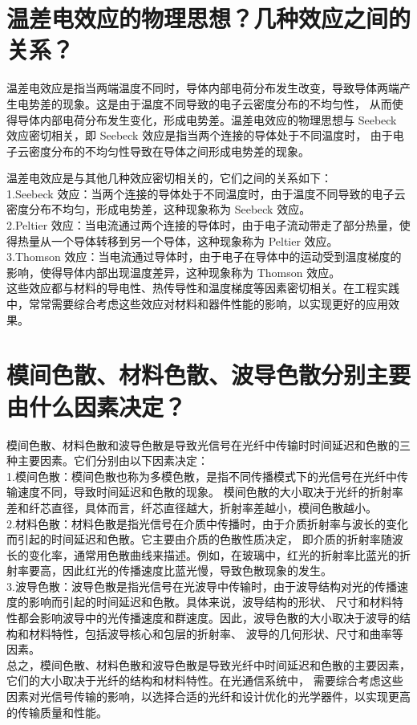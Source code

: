 \documentclass[12pt, a4paper, oneside]{article}
\begin{document}
\begin{spacing}{2.0}
\section{温差电效应的物理思想？几种效应之间的关系？}
温差电效应是指当两端温度不同时，导体内部电荷分布发生改变，导致导体两端产生电势差的现象。这是由于温度不同导致的电子云密度分布的不均匀性，
从而使得导体内部电荷分布发生变化，形成电势差。温差电效应的物理思想与 Seebeck 效应密切相关，即 Seebeck 效应是指当两个连接的导体处于不同温度时，
由于电子云密度分布的不均匀性导致在导体之间形成电势差的现象。

温差电效应是与其他几种效应密切相关的，它们之间的关系如下：
\\
1.Seebeck 效应：当两个连接的导体处于不同温度时，由于温度不同导致的电子云密度分布不均匀，形成电势差，这种现象称为 Seebeck 效应。
\\
2.Peltier 效应：当电流通过两个连接的导体时，由于电子流动带走了部分热量，使得热量从一个导体转移到另一个导体，这种现象称为 Peltier 效应。
\\
3.Thomson 效应：当电流通过导体时，由于电子在导体中的运动受到温度梯度的影响，使得导体内部出现温度差异，这种现象称为 Thomson 效应。
\\
这些效应都与材料的导电性、热传导性和温度梯度等因素密切相关。在工程实践中，常常需要综合考虑这些效应对材料和器件性能的影响，以实现更好的应用效果。


\section{模间色散、材料色散、波导色散分别主要由什么因素决定？}
模间色散、材料色散和波导色散是导致光信号在光纤中传输时时间延迟和色散的三种主要因素。它们分别由以下因素决定：
\\
1.模间色散：模间色散也称为多模色散，是指不同传播模式下的光信号在光纤中传输速度不同，导致时间延迟和色散的现象。
模间色散的大小取决于光纤的折射率差和纤芯直径，具体而言，纤芯直径越大，折射率差越小，模间色散越小。
\\
2.材料色散：材料色散是指光信号在介质中传播时，由于介质折射率与波长的变化而引起的时间延迟和色散。它主要由介质的色散性质决定，
即介质的折射率随波长的变化率，通常用色散曲线来描述。例如，在玻璃中，红光的折射率比蓝光的折射率要高，因此红光的传播速度比蓝光慢，导致色散现象的发生。
\\
3.波导色散：波导色散是指光信号在光波导中传输时，由于波导结构对光的传播速度的影响而引起的时间延迟和色散。具体来说，波导结构的形状、
尺寸和材料特性都会影响波导中的光传播速度和群速度。因此，波导色散的大小取决于波导的结构和材料特性，包括波导核心和包层的折射率、
波导的几何形状、尺寸和曲率等因素。
\\
总之，模间色散、材料色散和波导色散是导致光纤中时间延迟和色散的主要因素，它们的大小取决于光纤的结构和材料特性。在光通信系统中，
需要综合考虑这些因素对光信号传输的影响，以选择合适的光纤和设计优化的光学器件，以实现更高的传输质量和性能。


\end{spacing}
\end{document}

